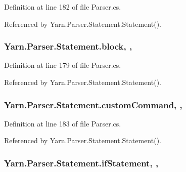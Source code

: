 Definition at line 182 of file Parser.\-cs.



Referenced by Yarn.\-Parser.\-Statement.\-Statement().

\hypertarget{a00166_ac14dfc7210974b4cd86402ed011fb0b6}{
\subsubsection[{block}]{ Yarn.\-Parser.\-Statement.\-block\hspace{0.3cm}{\ttfamily [get]}, {\ttfamily [set]}, {\ttfamily [package]}}}\label{a00166_ac14dfc7210974b4cd86402ed011fb0b6}


Definition at line 179 of file Parser.\-cs.



Referenced by Yarn.\-Parser.\-Statement.\-Statement().

\hypertarget{a00166_a8a98e7d4c66f9909da865f0e671d69f2}{
\subsubsection[{custom\-Command}]{ Yarn.\-Parser.\-Statement.\-custom\-Command\hspace{0.3cm}{\ttfamily [get]}, {\ttfamily [set]}, {\ttfamily [package]}}}\label{a00166_a8a98e7d4c66f9909da865f0e671d69f2}


Definition at line 183 of file Parser.\-cs.



Referenced by Yarn.\-Parser.\-Statement.\-Statement().

\hypertarget{a00166_a9a71577456598af0f25b23ccd02154e4}{
\subsubsection[{if\-Statement}]{ Yarn.\-Parser.\-Statement.\-if\-Statement\hspace{0.3cm}{\ttfamily [get]}, {\ttfamily [set]}, {\ttfamily [package]}}}\label{a00166_a9a71577456598af0f25b23ccd02154e4}


